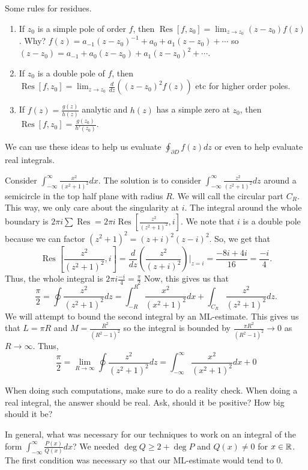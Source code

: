 \documentclass[11pt,leqno,oneside]{amsart}
\numberwithin{thm}{section}
\newcommand{\Res}{\operatorname{Res}}
\begin{document}
  Some rules for residues.
  \begin{enumerate}
  \item If $z_0$ is a simple pole of order $f$, then $\Res[f,z_0] =
    \lim_{z \to z_0} (z-z_0)f(z)$. Why? $f(z) = a_{-1}(z-z_0)^{-1} +
    a_0 + a_1(z-z_0) + \cdots$ so $(z-z_0) = a_{-1} + a_0(z-z_0) +
    a_1(z-z_0)^2 + \cdots$.
  \item If $z_0$ is a double pole of $f$, then $\Res[f,z_0] = \lim_{z
      \to z_0} \frac{d}{dz}((z-z_0)^2f(z))$ etc for higher order
    poles.
  \item If $f(z) = \frac{g(z)}{h(z)}$ analytic and $h(z)$ has a simple
    zero at $z_0$, then $\Res[f,z_0] = \frac{g(z_0)}{h'(z_0)}$.
  \end{enumerate}
  We can use these ideas to help us evaluate $\oint_{\partial D}
  f(z)dz$ or even to help evaluate real integrals.
  \begin{example}
    Consider $\int_{-\infty}^\infty \frac{x^2}{(x^2+1)^2}dx$. The
    solution is to consider $\int_{-\infty}^\infty
    \frac{z^2}{(z^2+1)^2}dz$ around a semicircle in the top half plane
    with radius $R$. We will call the circular part $C_R$. This way,
    we only care about the singularity at $i$. The integral around the
    whole boundary is $2 \pi i \sum \Res = 2 \pi i \Res[
    \frac{z^2}{(z^2+1)^2}, i]$. We note that $i$ is a double pole
    because we can factor $(z^2+1)^2 = (z+i)^2(z-i)^2$. So, we get
    that \[
      \Res[\frac{z^2}{(z^2+1)^2},i] = \frac{d}{dz}
    \left(
      \frac{z^2}{(z+i)^2}
    \right)|_{z=i} = \frac{-8i+4i}{16} = \frac{-i}{4}.
  \] Thus, the whole integral is $2 \pi i \frac{-i}{4} =
  \frac{\pi}{2}$
  Now, this gives us that \[
    \frac{\pi}{2} = \oint \frac{z^2}{(z^2+1)^2}dz = \int_{-R}^R
    \frac{x^2}{(x^2+1)^2}dx + \int_{C_R} \frac{z^2}{(z^2+1)^2}dz.
  \]
  We will attempt to bound the second integral by an ML-estimate. This
  gives us that $L = \pi R$ and $M = \frac{R^2}{(R^2-1)^2}$ so the
  integral is bounded by $\frac{\pi R^2}{(R^2-1)^2} \to 0$ as $R \to
  \infty$. Thus, \[
    \frac{\pi}{2} = \lim_{R \to \infty} \oint \frac{z^2}{(z^2+1)^2} dz =
    \int_{-\infty}^\infty \frac{x^2}{(x^2+1)^2}dx + 0
  \]
  \end{example}
  When doing such computations, make sure to do a reality check. When
  doing a real integral, the answer should be real. Ask, should it be
  positive? How big should it be?

  In general, what was necessary for our techniques to work on an
  integral of the form $\int_{-\infty}^\infty \frac{P(x)}{Q(x)}dx$? We
  needed $\operatorname{deg} Q \geq 2 + \operatorname{deg} P$ and
  $Q(x) \neq 0$ for $x \in {\mathbb R}$. The first condition was necessary so that our
  ML-estimate would tend to 0.
\end{document}
